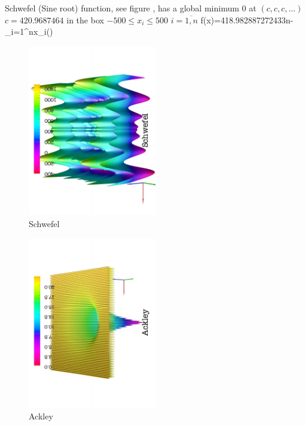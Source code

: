 \ee
%
\par{Schwefel (Sine root) function, see figure ,  has a global
minimum 0 at $(c,c,c,...)$ $c=420.9687464$ in the box
$-500\leq x_i \leq 500$ $i=\overline{1,n}$}
\be
\label{schwefelf}
f(x)=418.982887272433n-\sum_{i=1}^{n}x_i\sin()
\ee
\begin{figure}[!htb]
\begin{center}
\includegraphics[width=0.5\textwidth,angle=-90]{figures/schwefel}
\end{center}
\caption{Schwefel  }
\label{schwefel}
\end{figure}
%
\begin{figure}[!htb]
\begin{center}
\includegraphics[width=0.5\textwidth,angle=-90]{figures/ackley}
\end{center}
\caption{Ackley  }
\label{ackley}
\end{figure}
